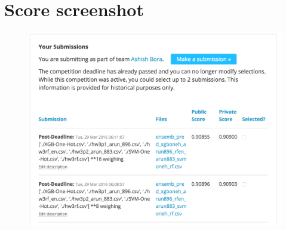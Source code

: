 \documentclass{article}
\begin{document}
\newpage

\section{Score screenshot}

\begin{figure}[h]
\includegraphics[width=\textwidth]{best}
\end{figure}
\end{document}
